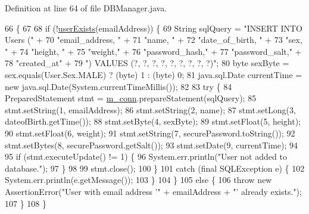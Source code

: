 Definition at line 64 of file D\+B\+Manager.\+java.


\begin{DoxyCode}
66                                                                                     \{
67 
68         \textcolor{keywordflow}{if} (!\mbox{\hyperlink{classcom_1_1activitytracker_1_1_d_b_manager_af05d79f33ecf2920a67d1b9cf82c079f}{userExists}}(emailAddress)) \{
69             String sqlQuery = \textcolor{stringliteral}{"INSERT INTO Users ("} +
70                     \textcolor{stringliteral}{"email\_address, "} +
71                     \textcolor{stringliteral}{"name, "} +
72                     \textcolor{stringliteral}{"date\_of\_birth, "} +
73                     \textcolor{stringliteral}{"sex, "} +
74                     \textcolor{stringliteral}{"height, "} +
75                     \textcolor{stringliteral}{"weight,"} +
76                     \textcolor{stringliteral}{"password\_hash,"} +
77                     \textcolor{stringliteral}{"password\_salt,"} +
78                     \textcolor{stringliteral}{"created\_at"} +
79                     \textcolor{stringliteral}{") VALUES (?, ?, ?, ?, ?, ?, ?, ?, ?)"};
80             byte sexByte = sex.equals(User.Sex.MALE) ? (byte) 1 : (byte) 0;
81             java.sql.Date currentTime = \textcolor{keyword}{new} java.sql.Date(System.currentTimeMillis());
82 
83             \textcolor{keywordflow}{try} \{
84                 PreparedStatement stmt = \mbox{\hyperlink{classcom_1_1activitytracker_1_1_d_b_manager_a064088d13ac09eb147fdc19268771521}{m\_conn}}.prepareStatement(sqlQuery);
85                 stmt.setString(1, emailAddress);
86                 stmt.setString(2, name);
87                 stmt.setLong(3, dateofBirth.getTime());
88                 stmt.setByte(4, sexByte);
89                 stmt.setFloat(5, height);
90                 stmt.setFloat(6, weight);
91                 stmt.setString(7, securePassword.toString());
92                 stmt.setBytes(8, securePassword.getSalt());
93                 stmt.setDate(9, currentTime);
94 
95                 \textcolor{keywordflow}{if} (stmt.executeUpdate() != 1) \{
96                     System.err.println(\textcolor{stringliteral}{"User not added to database."});
97                 \}
98 
99                 stmt.close();
100             \}
101             \textcolor{keywordflow}{catch} (\textcolor{keyword}{final} SQLException e) \{
102                 System.err.println(e.getMessage());
103             \}
104         \}
105         \textcolor{keywordflow}{else} \{
106             \textcolor{keywordflow}{throw} \textcolor{keyword}{new} AssertionError(\textcolor{stringliteral}{"User with email address '"} + emailAddress + \textcolor{stringliteral}{"' already exists."});
107         \}
108     \}
\end{DoxyCode}
\mbox{\label{classcom_1_1activitytracker_1_1_d_b_manager_adef71a18dc05536d80e83311841e1953}} 
